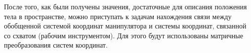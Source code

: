 \hspace*{\parindent}После того, как были получены значения, достаточные для описания положения тела в пространстве, можно приступать к задачам нахождения связи между обобщенной системой координат манипулятора и системы координат, связанной со схватом (рабочим инструментом). Для этого будут использованы матричные преобразования систем координат.\\

